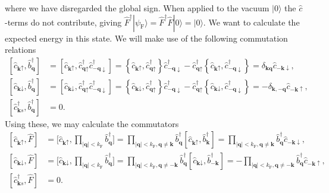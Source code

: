 \documentclass[english, parskip=full]{scrartcl}
\newcommand{\klam}{}
\newcommand{\klammer}{}
\newcommand{\tecxt}{}
\newcommand{\Ket}{}
\begin{document}
where we have disregarded the global sign.
When applied to the vacuum $\Ket | 0 \rangle$ the $\hat{c}$-terms do not contribute, giving $\hat{F}^\dagger \Ket | \psi_\tecxt\text{F} \rangle = \hat{F}^\dagger\hat{F} \Ket | 0 \rangle = \Ket | 0 \rangle$.
We want to calculate the expected energy in this state.
We will make use of the following commutation relations
\begin{align}
\klam\left[ \hat{c}_{\textbf{k}\uparrow}, \hat{b}_{\textbf{q}}^\dagger \right] &= \klam\left[ \hat{c}_{\textbf{k}\uparrow}, \hat{c}_{\textbf{q}\uparrow}^\dagger \hat{c}_{-\textbf{q}\downarrow}^\dagger  \right] = \klammer\left\{ \hat{c}_{\textbf{k}\uparrow}, \hat{c}_{\textbf{q}\uparrow}^\dagger \right\} \hat{c}_{-\textbf{q}\downarrow}^\dagger - \hat{c}_{\textbf{q}\uparrow}^\dagger \klammer\left\{ \hat{c}_{\textbf{k}\uparrow}, \hat{c}_{-\textbf{q}\downarrow}^\dagger \right\} = \delta_{\textbf{k}\textbf{q}} \hat{c}_{-\textbf{k}\downarrow},\\
\klam\left[ \hat{c}_{\textbf{k}\downarrow}, \hat{b}_{\textbf{q}}^\dagger \right] &= \klam\left[ \hat{c}_{\textbf{k}\downarrow}, \hat{c}_{\textbf{q}\uparrow}^\dagger \hat{c}_{-\textbf{q}\downarrow}^\dagger  \right] = \klammer\left\{ \hat{c}_{\textbf{k}\downarrow}, \hat{c}_{\textbf{q}\uparrow}^\dagger \right\} \hat{c}_{-\textbf{q}\downarrow}^\dagger - \hat{c}_{\textbf{q}\uparrow}^\dagger \klammer\left\{ \hat{c}_{\textbf{k}\downarrow}, \hat{c}_{-\textbf{q}\downarrow}^\dagger \right\} = -\delta_{\textbf{k},-\textbf{q}} \hat{c}_{-\textbf{k}\uparrow},\\
\klam\left[ \hat{c}_{\textbf{k}s}^\dagger, \hat{b}_{\textbf{q}}^\dagger \right] &= 0.
\end{align}
Using these, we may calculate the commutators
\begin{align}
\klam\left[ \hat{c}_{\textbf{k}\uparrow}, \hat{F} \right] &= \bigg[ \hat{c}_{\textbf{k}\uparrow}, \prod_{|\textbf{q}| < k_\tecxt\text{F}} \hat{b}_{\textbf{q}}^\dagger \bigg] = \prod_{|\textbf{q}| < k_\tecxt\text{F}, \textbf{q}\neq \textbf{k}} \hat{b}_{\textbf{q}}^\dagger \klam\left[ \hat{c}_{\textbf{k}\uparrow}, \hat{b}_\textbf{k}^\dagger \right] = \prod_{|\textbf{q}| < k_\tecxt\text{F}, \textbf{q}\neq \textbf{k}} \hat{b}_{\textbf{q}}^\dagger \hat{c}_{-\textbf{k}\downarrow} ,\\
\klam\left[ \hat{c}_{\textbf{k}\downarrow}, \hat{F} \right] &= \bigg[ \hat{c}_{\textbf{k}\downarrow}, \prod_{|\textbf{q}| < k_\tecxt\text{F}} \hat{b}_{\textbf{q}}^\dagger \bigg] = \prod_{|\textbf{q}| < k_\tecxt\text{F}, \textbf{q}\neq -\textbf{k}} \hat{b}_{\textbf{q}}^\dagger \klam\left[ \hat{c}_{\textbf{k}\downarrow}, \hat{b}_{-\textbf{k}}^\dagger \right] = - \prod_{|\textbf{q}| < k_\tecxt\text{F}, \textbf{q}\neq -\textbf{k}} \hat{b}_{\textbf{q}}^\dagger \hat{c}_{-\textbf{k}\uparrow},\\
\klam\left[ \hat{c}_{\textbf{k}s}^\dagger, \hat{F} \right] &= 0.
\end{align}
\end{document}
